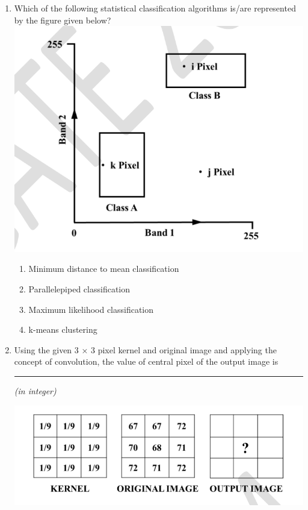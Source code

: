 \documentclass[12pt]{article}
\begin{document}
\begin{enumerate}
\item Which of the following statistical classification algorithms is/are represented by the
figure given below?\\

\includegraphics[]{Figs/LatexImage12.png} \\

\begin{enumerate}
    \item Minimum distance to mean classification 
   \item Parallelepiped classification 
   \item Maximum likelihood classification 
   \item k-means clustering 
\end{enumerate}

\item Using the given 3 × 3 pixel kernel and original image and applying the concept of
convolution, the value of central pixel of the output image is \rule{2cm}{0.15mm} \textit{(in integer)}

\includegraphics[]{Figs/LatexImage13.png}\\


\end{enumerate}
\end{document}
